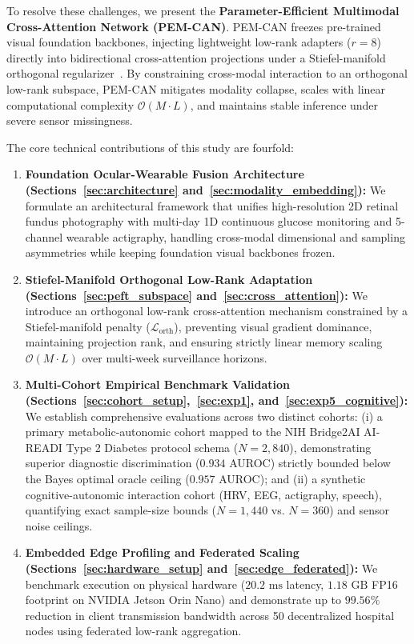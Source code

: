 \documentclass[a4paper,fleqn]{cas-dc}
\begin{document}
To resolve these challenges, we present the \textbf{Parameter-Efficient Multimodal Cross-Attention Network (PEM-CAN)}. PEM-CAN freezes pre-trained visual foundation backbones, injecting lightweight low-rank adapters ($r=8$) directly into bidirectional cross-attention projections under a Stiefel-manifold orthogonal regularizer~\cite{hu2022lora,edelman1998geometry}. By constraining cross-modal interaction to an orthogonal low-rank subspace, PEM-CAN mitigates modality collapse, scales with linear computational complexity $\mathcal{O}(M \cdot L)$, and maintains stable inference under severe sensor missingness.

The core technical contributions of this study are fourfold:
\begin{enumerate}
    \item \textbf{Foundation Ocular-Wearable Fusion Architecture (Sections~\ref{sec:architecture} and~\ref{sec:modality_embedding}):} We formulate an architectural framework that unifies high-resolution 2D retinal fundus photography with multi-day 1D continuous glucose monitoring and 5-channel wearable actigraphy, handling cross-modal dimensional and sampling asymmetries while keeping foundation visual backbones frozen.
    \item \textbf{Stiefel-Manifold Orthogonal Low-Rank Adaptation (Sections~\ref{sec:peft_subspace} and~\ref{sec:cross_attention}):} We introduce an orthogonal low-rank cross-attention mechanism constrained by a Stiefel-manifold penalty ($\mathcal{L}_{\text{orth}}$), preventing visual gradient dominance, maintaining projection rank, and ensuring strictly linear memory scaling $\mathcal{O}(M \cdot L)$ over multi-week surveillance horizons.
    \item \textbf{Multi-Cohort Empirical Benchmark Validation (Sections~\ref{sec:cohort_setup},~\ref{sec:exp1}, and~\ref{sec:exp5_cognitive}):} We establish comprehensive evaluations across two distinct cohorts: (i) a primary metabolic-autonomic cohort mapped to the NIH Bridge2AI AI-READI Type 2 Diabetes protocol schema ($N=2{,}840$), demonstrating superior diagnostic discrimination ($0.934$ AUROC) strictly bounded below the Bayes optimal oracle ceiling ($0.957$ AUROC); and (ii) a synthetic cognitive-autonomic interaction cohort (HRV, EEG, actigraphy, speech), quantifying exact sample-size bounds ($N=1{,}440$ vs. $N=360$) and sensor noise ceilings.
    \item \textbf{Embedded Edge Profiling and Federated Scaling (Sections~\ref{sec:hardware_setup} and~\ref{sec:edge_federated}):} We benchmark execution on physical hardware ($20.2\text{ ms}$ latency, $1.18\text{ GB}$ FP16 footprint on NVIDIA Jetson Orin Nano) and demonstrate up to $99.56\%$ reduction in client transmission bandwidth across 50 decentralized hospital nodes using federated low-rank aggregation.
\end{enumerate}
\end{document}
